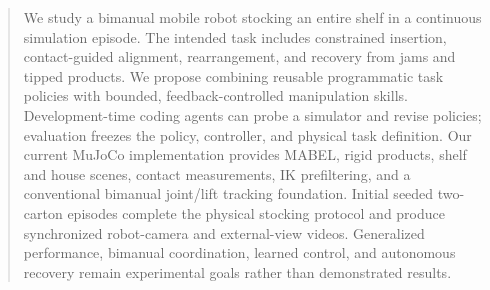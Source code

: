 \begin{abstract}
We study a bimanual mobile robot stocking an entire shelf in a continuous
simulation episode. The intended task includes constrained insertion,
contact-guided alignment, rearrangement, and recovery from jams and tipped
products. We propose combining reusable programmatic task policies with
bounded, feedback-controlled manipulation skills. Development-time coding
agents can probe a simulator and revise policies; evaluation freezes the policy,
controller, and physical task definition. Our current MuJoCo implementation
provides MABEL, rigid products, shelf and house scenes, contact measurements,
IK prefiltering, and a conventional bimanual joint/lift tracking foundation.
Initial seeded two-carton episodes complete the physical stocking protocol and
produce synchronized robot-camera and external-view videos. Generalized
performance, bimanual coordination, learned control, and autonomous recovery
remain experimental goals rather than demonstrated results.
\end{abstract}

